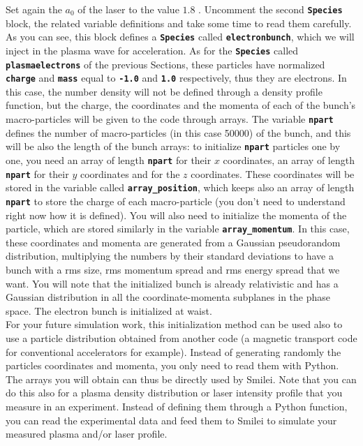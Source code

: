 \documentclass[a4paper,12pt]{extarticle}
\newcommand{\smilei}{{\sc Smilei}\xspace}
\newcommand{\commandline}[1]{\texttt{\textbf{#1}}}
\begin{document}
Set again the $a_0$ of the laser to  the value $1.8$ . Uncomment the second \commandline{Species} block, the related variable definitions and take some time to read them carefully. As you can see, this block defines a \commandline{Species} called \commandline{electronbunch}, which we will inject in the plasma wave for acceleration. As for the \commandline{Species} called \commandline{plasmaelectrons} of the previous  Sections, these particles have normalized \commandline{charge} and \commandline{mass} equal to \commandline{-1.0} and \commandline{1.0} respectively, thus they are electrons. In this case,  the number density will not be defined through a density profile function, but the charge, the coordinates and the momenta of each of the bunch's macro-particles will be given to the code through arrays. The variable \commandline{npart} defines the number of macro-particles (in  this case 50000) of the bunch, and this will be also the length of the bunch arrays: to initialize \commandline{npart} particles one by one, you need an array of length \commandline{npart} for their $x$ coordinates, an array of length \commandline{npart} for their $y$ coordinates and for the $z$ coordinates. These coordinates will be stored in the variable called \commandline{array\_position}, which keeps also an array of length \commandline{npart} to store the charge of each macro-particle (you don't need to understand right now how it is defined). You will also need to initialize the momenta of the particle, which are stored similarly in the variable \commandline{array\_momentum}. In this case, these coordinates and momenta are generated from a Gaussian pseudorandom distribution, multiplying the numbers by their standard deviations to have a bunch with a rms size, rms momentum spread and rms energy spread that we want. You will note that the initialized bunch is already relativistic and has a Gaussian distribution in all the coordinate-momenta subplanes in the phase space. The electron bunch is initialized at waist.\\

For your future  simulation work, this initialization method can be used also to use a particle distribution obtained from another code (a magnetic transport code for conventional accelerators for example). Instead of generating randomly the particles coordinates and momenta, you only need to read them with Python. The arrays you will obtain can thus be directly used by \smilei. Note that you can do this also for a plasma density distribution or laser intensity profile that you measure in an experiment. Instead of defining them through a Python function, you  can read the experimental data and feed them to \smilei to simulate your measured plasma and/or laser profile.\\
\end{document}
